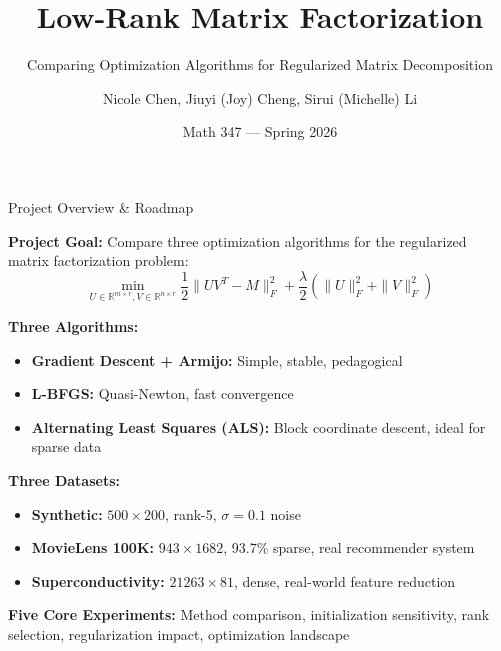 \documentclass[aspectratio=169,usenames,dvipsnames]{beamer}
\title{Low-Rank Matrix Factorization}
\subtitle{Comparing Optimization Algorithms for Regularized Matrix Decomposition}
\author{Nicole Chen, Jiuyi (Joy) Cheng, Sirui (Michelle) Li}
\date{Math 347 --- Spring 2026}
\institute{University}
\begin{document}
\begin{frame}
\titlepage
\end{frame}

\begin{frame}{Project Overview \& Roadmap}

\textbf{Project Goal:} Compare three optimization algorithms for the regularized matrix factorization problem:
\[
\min_{U \in \mathbb{R}^{m \times r}, V \in \mathbb{R}^{n \times r}} 
\frac{1}{2}\|UV^T - M\|_F^2 + \frac{\lambda}{2}(\|U\|_F^2 + \|V\|_F^2)
\]

\vspace{0.3cm}

\textbf{Three Algorithms:}
\begin{itemize}
  \item \textbf{Gradient Descent + Armijo:} Simple, stable, pedagogical
  \item \textbf{L-BFGS:} Quasi-Newton, fast convergence
  \item \textbf{Alternating Least Squares (ALS):} Block coordinate descent, ideal for sparse data
\end{itemize}

\vspace{0.3cm}

\textbf{Three Datasets:}
\begin{itemize}
  \item \textbf{Synthetic:} $500 \times 200$, rank-5, $\sigma=0.1$ noise
  \item \textbf{MovieLens 100K:} $943 \times 1682$, 93.7\% sparse, real recommender system
  \item \textbf{Superconductivity:} $21263 \times 81$, dense, real-world feature reduction
\end{itemize}

\vspace{0.3cm}

\textbf{Five Core Experiments:} Method comparison, initialization sensitivity, rank selection, regularization impact, optimization landscape

\end{frame}
\end{document}
